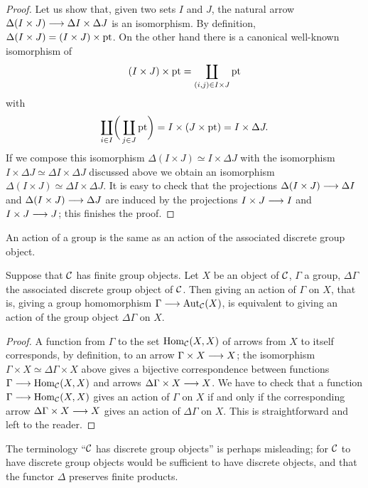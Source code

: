 \begin{2   CONTRAVARIANT FUNCTORS}
\begin{2.2 Group objects}
\begin{proof}
Let us show that, given two sets $I$ and $J$, the natural arrow $\Delta(I \times J) \arr \Delta I \times \Delta J$ is an isomorphism. By definition, $\Delta(I \times J) = (I \times J) \times \mathrm{pt}$. On the other hand there is a canonical well-known isomorphism of
   \[
   (I \times J) \times \mathrm{pt} = \coprod_{(i,j) \in I \times J} \mathrm{pt}
   \]
with
   \[
   \coprod_{i \in I} \biggl(\,\coprod_{j \in J}
   \mathrm{pt}\biggr) = I \times (J
   \times \mathrm{pt}) = I \times \Delta J.
   \]
If we compose this isomorphism $\Delta(I \times J) \simeq I \times \Delta J$ with the isomorphism $I \times \Delta J \simeq \Delta I \times \Delta J$ discussed above we obtain an isomorphism $\Delta(I \times J) \simeq \Delta I \times \Delta J$. It is easy to check that the projections $\Delta(I \times J) \arr \Delta I$ and $\Delta(I \times J) \arr \Delta J$ are induced by the projections $I \times J \arr I$ and $I \times J \arr J$; this finishes the proof.
\end{proof}

An action of a group is the same as an action of the associated discrete group object.

\begin{proposition}\label{prop:action-discrete-group}
Suppose that $\mathcal{C}$ has finite group objects. Let $X$ be an object of $\mathcal{C}$, $\Gamma$ a group, $\Delta\Gamma$ the associated discrete group object of $\mathcal{C}$. Then giving an action of $\Gamma$ on $X$, that is, giving a group homomorphism $\Gamma \arr \aut_{\cC}(X)$, is equivalent to giving an action of the group object $\Delta\Gamma$ on $X$.
\end{proposition}

\begin{proof}
A function from $\Gamma$ to the set $\operatorname{Hom}_{\mathcal{C}}(X, X)$ of arrows from $X$ to itself corresponds, by definition, to an arrow $\Gamma \times X \arr X$; the isomorphism $\Gamma \times X \simeq \Delta\Gamma \times X$ above gives a bijective correspondence between functions $\Gamma \arr \hom_{\cC}(X, X)$ and arrows $\Delta\Gamma \times X \arr X$. We have to check that a function $\Gamma \arr \hom_{\cC}(X, X)$ gives an action of $\Gamma$ on $X$ if and only if the corresponding arrow $\Delta\Gamma \times X \arr X$ gives an action of $\Delta\Gamma$ on $X$. This is straightforward and left to the reader. 
\end{proof}

\begin{remark}
The terminology ``$\mathcal{C}$ has discrete group objects'' is perhaps misleading; for $\mathcal{C}$ to have discrete group objects would be sufficient to have discrete objects, and that the functor $\Delta$ preserves finite products.


\end{remark}
\end{2.2 Group objects}
\end{2   CONTRAVARIANT FUNCTORS}
